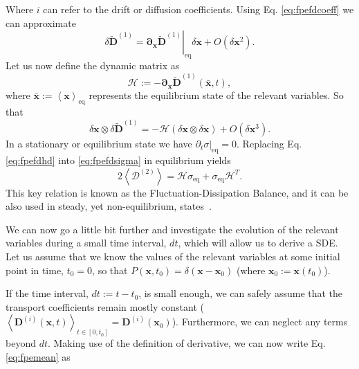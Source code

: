 \documentclass[ twoside,openright,titlepage,numbers=noenddot,%
headinclude,footinclude,cleardoublepage=empty,abstract=on,
BCOR=5mm,paper=b5,fontsize=11pt, dvipsnames
]{scrreprt}
\renewcommand{\vec}[1]{\bm{#1}}
\newcommand{\tens}[1]{\bm{\mathcal{#1}}}
\begin{document}
Where $i$ can refer to the drift or diffusion coefficients.
Using Eq. \eqref{eq:fpefdcoeff} we can approximate
\begin{equation}
  \delta\widetilde{\vec{D}}^{(1)} = \left.\vec{\partial}_{\vec{x}}\widetilde{\vec{D}}^{(1)}\right|_{\text{eq}}\delta\vec{x} + O\left(\delta\vec{x}^2\right).
\end{equation}
Let us now define the dynamic matrix as
\begin{equation}
  \tens{H} := -\vec{\partial}_{\vec{x}}\widetilde{\vec{D}}^{(1)}(\bar{\vec{x}},t),  
\end{equation}
where $\bar{\vec{x}}:=\left\langle\vec{x}\right\rangle_{\text{eq}}$ represents the equilibrium state of the relevant variables.
So that
\begin{equation}
  \label{eq:fpefdhd}
  \delta\vec{x}\otimes\delta\widetilde{\vec{D}}^{(1)} = -\tens{H}\left(\delta\vec{x}\otimes\delta\vec{x}\right) + O\left(\delta\vec{x}^3\right).
\end{equation}
In a stationary or equilibrium state we have $\partial_t\left.\tens{\sigma}\right|_{\text{eq}} = 0$. Replacing Eq. \eqref{eq:fpefdhd} into \eqref{eq:fpefdsigma} in equilibrium yields
\begin{equation}
  \label{eq:fpefdbal}
  2\left\langle\tens{D}^{(2)}\right\rangle = \tens{H}\tens{\sigma}_{\text{eq}} + \tens{\sigma}_{\text{eq}}\tens{H}^T.
\end{equation}
This key relation is known as the Fluctuation-Dissipation Balance, and it can be also used in steady, yet non-equilibrium, states~\cite{Zarate2006}.

We can now go a little bit further and investigate the evolution of the relevant variables during a small time interval, $dt$, which will allow us to derive a \gls{SDE}.
Let us assume that we know the values of the relevant variables at some initial point in time, $t_0 = 0$, so that $P(\vec{x}, t_0) = \delta(\vec{x}-\vec{x}_0)$ (where $\vec{x}_0 :=\vec{x}(t_0)$).

If the time interval, $dt := t-t_0$, is small enough, we can safely assume that the transport coefficients remain mostly constant ($\left\langle\vec{D}^{(i)}(\vec{x},t)\right\rangle_{t\in[0,t_0]}=\vec{D}^{(i)}(\vec{x}_0)$). Furthermore, we can neglect any terms beyond $dt$. 
Making use of the definition of derivative, we can now write Eq. \eqref{eq:fpemean} as
\end{document}
